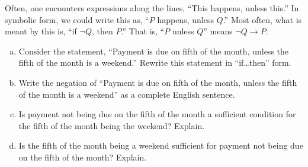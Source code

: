 \documentclass[11pt,letterpaper]{article}
\begin{document}

 Often, one encounters expressions along the lines, ``This happens, unless this.'' In symbolic form, we could write this as, ``$P$ happens, unless $Q$.'' Most often, what is meant by this is, ``if $\neg Q$, then $P$.'' That is, ``$P$ unless $Q$'' means $\neg Q \to P$. 
	\begin{enumerate}[(a)]
	\item Consider the statement, ``Payment is due on fifth of the month, unless the fifth of the month is a weekend.'' Rewrite this statement in ``if\dots then'' form.  
	\item Write the negation of ``Payment is due on fifth of the month, unless the fifth of the month is a weekend'' as a complete English sentence. 
	\item Is payment not being due on the fifth of the month a sufficient condition for the fifth of the month being the weekend? Explain. 
	\item Is the fifth of the month being a weekend sufficient for payment not being due on the fifth of the month? Explain. 
	\end{enumerate} 
\end{document}
